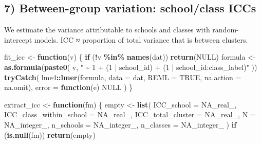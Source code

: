 \documentclass[
  10pt,
]{article}
\newenvironment{Shaded}{\begin{snugshade}}{\end{snugshade}}
\newcommand{\AttributeTok}[1]{\textcolor[rgb]{0.13,0.29,0.53}{#1}}
\newcommand{\ConstantTok}[1]{\textcolor[rgb]{0.56,0.35,0.01}{#1}}
\newcommand{\ControlFlowTok}[1]{\textcolor[rgb]{0.13,0.29,0.53}{\textbf{#1}}}
\newcommand{\FunctionTok}[1]{\textcolor[rgb]{0.13,0.29,0.53}{\textbf{#1}}}
\newcommand{\NormalTok}[1]{#1}
\newcommand{\OtherTok}[1]{\textcolor[rgb]{0.56,0.35,0.01}{#1}}
\newcommand{\SpecialCharTok}[1]{\textcolor[rgb]{0.81,0.36,0.00}{\textbf{#1}}}
\newcommand{\StringTok}[1]{\textcolor[rgb]{0.31,0.60,0.02}{#1}}
\begin{document}
\hypertarget{between-group-variation-schoolclass-iccs}{%
\subsection{7) Between-group variation: school/class
ICCs}\label{between-group-variation-schoolclass-iccs}}

We estimate the variance attributable to schools and classes with
random-intercept models. ICC ≈ proportion of total variance that is
between clusters.

\begin{Shaded}
\begin{Highlighting}[]
\NormalTok{fit\_icc }\OtherTok{\textless{}{-}} \ControlFlowTok{function}\NormalTok{(v) \{}
  \ControlFlowTok{if}\NormalTok{ (}\SpecialCharTok{!}\NormalTok{v }\SpecialCharTok{\%in\%} \FunctionTok{names}\NormalTok{(dat)) }\FunctionTok{return}\NormalTok{(}\ConstantTok{NULL}\NormalTok{)}
\NormalTok{  formula }\OtherTok{\textless{}{-}} \FunctionTok{as.formula}\NormalTok{(}\FunctionTok{paste0}\NormalTok{(}
\NormalTok{    v, }\StringTok{" \textasciitilde{} 1 + (1 | school\_id) + (1 | school\_id:class\_label)"}
\NormalTok{  ))}
  \FunctionTok{tryCatch}\NormalTok{(}
\NormalTok{    lme4}\SpecialCharTok{::}\FunctionTok{lmer}\NormalTok{(formula, }\AttributeTok{data =}\NormalTok{ dat, }\AttributeTok{REML =} \ConstantTok{TRUE}\NormalTok{, }\AttributeTok{na.action =}\NormalTok{ na.omit),}
    \AttributeTok{error =} \ControlFlowTok{function}\NormalTok{(e) }\ConstantTok{NULL}
\NormalTok{  )}
\NormalTok{\}}

\NormalTok{extract\_icc }\OtherTok{\textless{}{-}} \ControlFlowTok{function}\NormalTok{(fm) \{}
\NormalTok{  empty }\OtherTok{\textless{}{-}} \FunctionTok{list}\NormalTok{(}
    \AttributeTok{ICC\_school =} \ConstantTok{NA\_real\_}\NormalTok{, }\AttributeTok{ICC\_class\_within\_school =} \ConstantTok{NA\_real\_}\NormalTok{,}
    \AttributeTok{ICC\_total\_cluster =} \ConstantTok{NA\_real\_}\NormalTok{, }\AttributeTok{N =} \ConstantTok{NA\_integer\_}\NormalTok{, }\AttributeTok{n\_schools =} \ConstantTok{NA\_integer\_}\NormalTok{,}
    \AttributeTok{n\_classes =} \ConstantTok{NA\_integer\_}
\NormalTok{  )}
  \ControlFlowTok{if}\NormalTok{ (}\FunctionTok{is.null}\NormalTok{(fm)) }\FunctionTok{return}\NormalTok{(empty)}


\end{Highlighting}
\end{Shaded}
\end{document}
